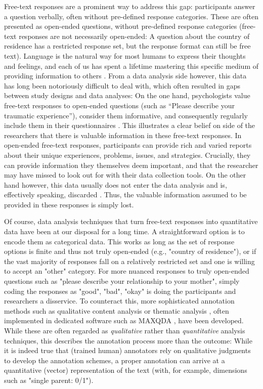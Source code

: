 \documentclass[man,floatsintext]{apa7}
\newcommand{\change}[1]{#1}
\begin{document}
\change{Free-text responses are a prominent way to address this gap: participants answer a question verbally, often without pre-defined response categories.} These are often presented as open-ended questions, without pre-defined response categories (free-text responses are not necessarily open-ended: A question about the country of residence has a restricted response set, but the response format can still be free text). Language is the natural way for most humans to express their thoughts and feelings, and each of us has spent a lifetime mastering this specific medium of providing information to others \parencite{kjell2023text,tausczik2010psychological}. From a data analysis side however, this data has long been notoriously difficult to deal with, which often resulted in gaps between  study designs and  data analyses: On the one hand, psychologists value free-text responses to open-ended questions (such as ``Please describe your traumatic experience''), consider them informative, and consequently regularly include them in their questionnaires \parencite{schuman1979open,singer2017some}. This illustrates a clear belief on side of the researchers that there is valuable information in these free-text responses. In open-ended free-text responses, participants can provide rich and varied reports about their unique experiences, problems, issues, and strategies. Crucially, they can provide information they themselves deem important, and that the researcher may have missed to look out for with their data collection tools. On the other hand however, this data usually does not enter the data analysis and is, effectively speaking, discarded \parencite{singer2017some,roberts2014structural}. Thus, the valuable information assumed to be provided in these responses is simply lost.

Of course, data analysis techniques that turn free-text responses into quantitative data have been at our disposal for a long time. A straightforward option is to encode them as categorical data. This works as long as the set of response options is finite and thus not truly open-ended (e.g., "country of residence"), or if the vast majority of responses fall on a relatively restricted set and one is willing to accept an "other" category. For more nuanced responses to truly open-ended questions such as "please describe your relationship to your mother", simply coding the responses as "good", "bad", "okay" is doing the participants and researchers a disservice. To counteract this, more sophisticated annotation methods such as qualitative content analysis \parencite{mayring2014qualitative} or thematic analysis \parencite{braun2006using}, often implemented in dedicated software such as MAXQDA \parencite{maxqda}, have been developed. While these are often regarded as \emph{qualitative} rather than \emph{quantitative} analysis techniques, this describes the annotation process more than the outcome: While it is indeed true that (trained human) annotators rely on qualitative judgments to develop the annotation schemes, a proper annotation can arrive at a quantitative (vector) representation of the text (with, for example, dimensions such as "single parent: 0/1"). 
\end{document}

